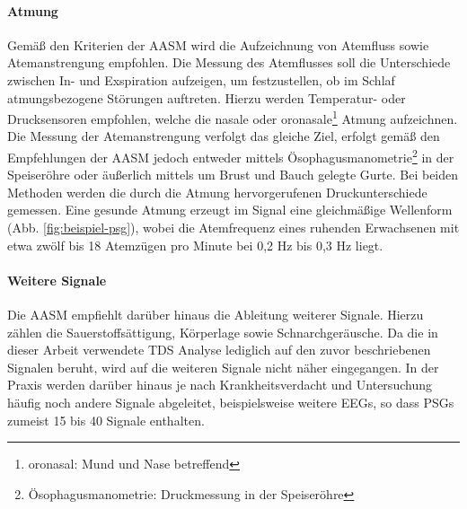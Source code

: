 \paragraph{Atmung}
Gemäß den Kriterien der \acs{AASM} wird die Aufzeichnung von Atemfluss sowie Atemanstrengung empfohlen. Die Messung des Atemflusses soll die Unterschiede zwischen In- und Exspiration aufzeigen, um festzustellen, ob im Schlaf atmungsbezogene Störungen auftreten. Hierzu werden Temperatur- oder Drucksensoren empfohlen, welche die nasale oder oronasale\footnote{oronasal: Mund und Nase betreffend} Atmung aufzeichnen. Die Messung der Atemanstrengung verfolgt das gleiche Ziel, erfolgt gemäß den Empfehlungen der \acs{AASM} jedoch entweder mittels Ösophagusmanometrie\footnote{Ösophagusmanometrie: Druckmessung in der Speiseröhre} in der Speiseröhre oder äußerlich mittels um Brust und Bauch gelegte Gurte. Bei beiden Methoden werden die durch die Atmung hervorgerufenen Druckunterschiede gemessen. Eine gesunde Atmung erzeugt im Signal eine gleichmäßige Wellenform (Abb. \ref{fig:beispiel-psg}), wobei die Atemfrequenz eines ruhenden Erwachsenen mit etwa zwölf bis 18 Atemzügen pro Minute bei 0,2 Hz bis 0,3 Hz liegt. \parencite{iber_aasm_2007, lee-chiong_sleep_2008, leroux_handbuch_2009, steffel_lunge_2014}\\

\paragraph{Weitere Signale}
Die \acs{AASM} empfiehlt darüber hinaus die Ableitung weiterer Signale. Hierzu zählen die Sauerstoffsättigung, Körperlage sowie Schnarchgeräusche. Da die in dieser Arbeit verwendete \acs{TDS} Analyse lediglich auf den zuvor beschriebenen Signalen beruht, wird auf die weiteren Signale nicht näher eingegangen. In der Praxis werden darüber hinaus je nach Krankheitsverdacht und Untersuchung häufig noch andere Signale abgeleitet, beispielsweise weitere \acs{EEG}s, so dass \acs{PSG}s zumeist 15 bis 40 Signale enthalten. \\

